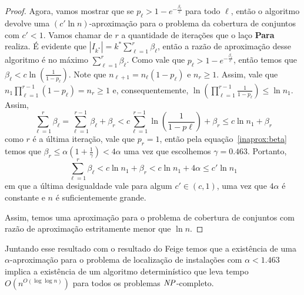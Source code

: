\begin{proof}
Agora, vamos mostrar que se $p_\ell > 1 - e^{ - \frac{\beta_\ell}{c}}$ para todo $\ell$, então o algoritmo devolve uma $(c'\ln n)$-aproximação para o problema da cobertura de conjuntos com $c' < 1$. Vamos chamar de $r$ a quantidade de iterações que o laço {\bf Para} realiza. É evidente que $|I_{k^*}| = k^*\sum_{\ell = 1}^r \beta_\ell$, então a razão de aproximação desse algoritmo é no máximo $\sum_{\ell = 1}^r \beta_\ell$. Como vale que $p_\ell > 1 - e^{ - \frac{\beta_\ell}{c}}$, então temos que $\beta_\ell < c \ln\left( \frac{1}{1-p_\ell}\right)$. Note que $n_{\ell + 1} = n_\ell(1-p_\ell)$ e $n_r \geq 1$. Assim, vale que $n_1 \prod_{\ell =1}^{r-1} (1 - p_\ell) = n_r \geq 1$ e, consequentemente, $\ln\left(\prod_{\ell =1 }^{r-1} \frac{1}{1-p_\ell}\right) \leq \ln n_1$. Assim,
\[
\sum_{\ell= 1}^r \beta_\ell = \sum_{\ell =1}^{r-1} \beta_\ell + \beta_r < c\sum_{\ell = 1}^{r-1} \ln \left( \frac{1}{1-p\ell}\right) + \beta_r \leq c \ln n_1 + \beta_r
\]
como $r$ é a última iteração, vale que $p_r= 1$, então pela equação~\eqref{inaprox:beta} temos que $\beta_r \leq \alpha(1 + \frac{1}{\gamma}) < 4\alpha$ uma vez que escolhemos $\gamma = 0.463$. Portanto,
\[
\sum_{\ell =1}^r \beta_\ell < c \ln n_1 + \beta_r < c\ln n_1 + 4\alpha \leq c' \ln n_1
\]
em que a última desigualdade vale para algum $c' \in (c,1)$, uma vez que $4\alpha$ é constante e $n$ é suficientemente grande.

Assim, temos uma aproximação para o problema de cobertura de conjuntos com razão de aproximação estritamente menor que $\ln n$.
\end{proof}

Juntando esse resultado com o resultado do Feige temos que a existência de uma $\alpha$-aproximação para o problema de localização de instalações com $\alpha < 1.463$ implica a existência de um algoritmo determinístico que leva tempo $O(n^{O(\log \log n)})$ para todos os problemas $\mathit{NP}$-completo.